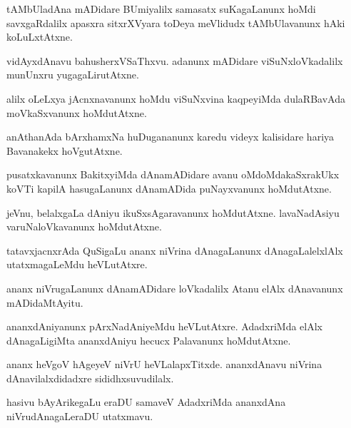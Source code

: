 \begin{mng}
tAMbUladAna mADidare BUmiyalilx samasatx suKagaLanunx hoMdi savxgaRdalilx apasxra sitxrXVyara toDeya meVlidudx tAMbUlavanunx hAki koLuLxtAtxne.
\end{mng}

\begin{mng}
vidAyxdAnavu bahusherxVSaThxvu. adanunx mADidare viSuNxloVkadalilx munUnxru yugagaLirutAtxne.
\end{mng}

\begin{mng}
alilx oLeLxya jAcnxnavanunx hoMdu viSuNxvina kaqpeyiMda dulaRBavAda moVkaSxvanunx hoMdutAtxne.
\end{mng}

\begin{mng}
anAthanAda bArxhamxNa huDugananunx karedu videyx kalisidare hariya Bavanakekx hoVgutAtxne.
\end{mng}

\begin{mng}
pusatxkavanunx BakitxyiMda dAnamADidare avanu oMdoMdakaSxrakUkx koVTi kapilA hasugaLanunx dAnamADida puNayxvanunx hoMdutAtxne.
\end{mng}

\begin{mng}
jeVnu, belalxgaLa dAniyu ikuSxsAgaravanunx hoMdutAtxne. lavaNadAsiyu varuNaloVkavanunx hoMdutAtxne.
\end{mng}

\begin{mng}
tatavxjacnxrAda QuSigaLu ananx niVrina dAnagaLanunx dAnagaLalelxlAlx utatxmagaLeMdu heVLutAtxre.
\end{mng}

\begin{mng}
ananx niVrugaLanunx dAnamADidare loVkadalilx Atanu elAlx dAnavanunx mADidaMtAyitu.
\end{mng}

\begin{mng}
ananxdAniyanunx pArxNadAniyeMdu heVLutAtxre. AdadxriMda elAlx dAnagaLigiMta ananxdAniyu hecucx Palavanunx hoMdutAtxne.
\end{mng}

\begin{mng}
ananx heVgoV hAgeyeV niVrU heVLalapxTitxde. ananxdAnavu niVrina dAnavilalxdidadxre sididhxsuvudilalx.
\end{mng}

\begin{mng}
hasivu bAyArikegaLu eraDU samaveV AdadxriMda ananxdAna niVrudAnagaLeraDU utatxmavu.
\end{mng}

